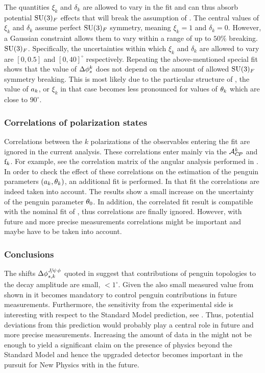 \noindent The quantities $\xi_k$ and $\delta_k$ are allowed to vary in the fit and can thus absorb
potential $\mathrm{SU}(3)_F$ effects that will break the assumption of .
The central values of $\xi_k$ and $\delta_k$ assume perfect $\mathrm{SU}(3)_F$ symmetry, meaning $\xi_k=1$ and $\delta_k=0$.
However, a Gaussian constraint allows them to vary within a range of up to $50\%$ breaking.
$\mathrm{SU}(3)_F$. Specifically, the uncertainties within which $\xi_k$ and $\delta_k$ are allowed to
vary are $[0,0.5]$ and $[0,40]^\circ$ respectively.
Repeating the above-mentioned special fit shows that the value of $\Delta\phi_{s}^{k}$
does not depend on the amount of allowed $\mathrm{SU}(3)_F$ symmetry breaking.
This is most likely due to the particular structure of , \ie the value of
$a_k$, or $\xi_k$ in that case becomes less pronounced for values of $\theta_k$ which are close to $90^\circ$.

\subsubsection{Correlations of polarization states}
Correlations between the $k$ polarizations of the observables entering the \chisq fit are ignored in the
current analysis. These correlations enter mainly via the $\mathcal{A}_{C\!P}^{k}$ and $\text{f}_{k}$. For example, see the
correlation matrix  of the angular analysis performed in .
In order to check the effect of these correlations on the estimation of the penguin parameters $(a_k,\theta_k)$,
an additional \chisq fit is performed. In that fit the correlations are indeed taken into account.
The results show a small increase on the uncertainty of the penguin parameter $\theta_{0}$.
In addition, the correlated fit result is compatible with the nominal fit of ,
thus correlations are finally ignored. However, with future and more precise measurements correlations
might be important and maybe have to be taken into account.

\subsubsection{Conclusions}
The shifts $\Delta\phi^{{J\mskip -3mu/\mskip -2mu\psi\mskip 2mu}\phi}_{s,{k}}$ quoted in 
suggest that contributions of penguin topologies to the \BsJpsiPhi decay amplitude are
small, $<1^\circ$. Given the also small \phis measured value from \lhcb shown in 
it becomes mandatory to control penguin contributions in future \phis measurements.
Furthermore, the sensitivity from the experimental side is interesting with respect to
the Standard Model prediction, see . Thus, potential deviations from this
prediction would probably play a central role in future and more precise \phis measurements.
Increasing the amount of data in the \lhc \runtwo might not be enough to yield
a significant claim on the presence of physics beyond the Standard Model and hence
the upgraded \lhcb detector becomes important in the pursuit for New Physics with \phis in the future.
